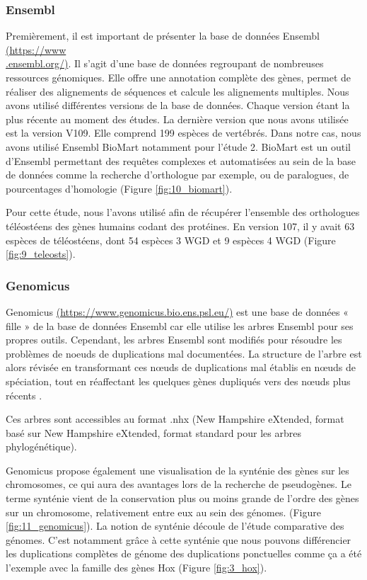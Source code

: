 \subsubsection{Ensembl}\label{ensembl}
\par Premièrement, il est important de présenter la base de données Ensembl \href{https://www.ensembl.org/}{(https://www\\.ensembl.org/)}. Il s’agit d’une base de données regroupant de nombreuses ressources génomiques. Elle offre une annotation complète des gènes, permet de réaliser des alignements de séquences et calcule les alignements multiples. Nous avons utilisé différentes versions de la base de données. Chaque version étant la plus récente au moment des études. La dernière version que nous avons utilisée est la version V109. Elle comprend 199 espèces de vertébrés. Dans notre cas, nous avons utilisé Ensembl BioMart notamment pour l’étude 2. BioMart est un outil d’Ensembl permettant des requêtes complexes et automatisées au sein de la base de données comme la recherche d’orthologue par exemple, ou de paralogues, de pourcentages d’homologie (Figure \ref{fig:10_biomart}). 
\par Pour cette étude, nous l’avons utilisé afin de récupérer l’ensemble des orthologues téléostéens des gènes humains codant des protéines. En version 107, il y avait 63 espèces de téléostéens, dont 54 espèces 3 WGD et 9 espèces 4 WGD (Figure \ref{fig:9_teleosts}).

\subsubsection{Genomicus}\label{genomicus}
\par Genomicus \href{https://www.genomicus.bio.ens.psl.eu/}{(https://www.genomicus.bio.ens.psl.eu/)} est une base de données « fille » de la base de données Ensembl car elle utilise les arbres Ensembl pour ses propres outils. Cependant, les arbres Ensembl sont modifiés pour résoudre les problèmes de noeuds de duplications mal documentées. La structure de l'arbre est alors révisée en transformant ces nœuds de duplications mal établis en nœuds de spéciation, tout en réaffectant les quelques gènes dupliqués vers des nœuds plus récents \parencite{louis_genomicus_2015}.
\par Ces arbres sont accessibles au format .nhx (New Hampshire eXtended, format basé sur New Hampshire eXtended, format standard pour les arbres phylogénétique). 
\par Genomicus propose également une visualisation de la synténie des gènes sur les chromosomes, ce qui aura des avantages lors de la recherche de pseudogènes. Le terme synténie vient de la conservation plus ou moins grande de l’ordre des gènes sur un chromosome, relativement entre eux au sein des génomes. (Figure \ref{fig:11_genomicus}). La notion de synténie découle de l’étude comparative des génomes. C’est notamment grâce à cette synténie que nous pouvons différencier les duplications complètes de génome des duplications ponctuelles comme ça a été l’exemple avec la famille des gènes Hox (Figure \ref{fig:3_hox}). \newpage

